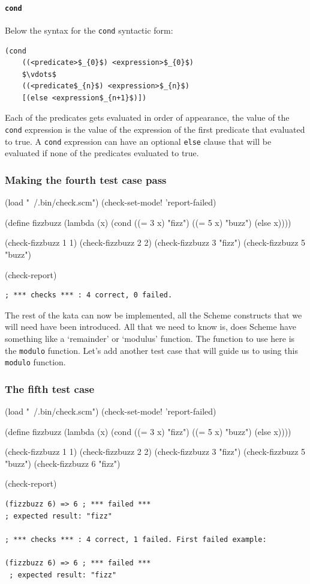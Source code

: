 \documentclass[12pt,a4paper,english,twoside]{article}
\begin{document}
\paragraph{\texttt{cond}}
Below the syntax for the \texttt{cond} syntactic form:
\begin{lstlisting}[mathescape]
  (cond 
    ((<predicate>$_{0}$) <expression>$_{0}$)
    $\vdots$ 
    ((<predicate$_{n}$) <expression>$_{n}$)
    [(else <expression$_{n+1}$)])
\end{lstlisting}
Each of the predicates gets evaluated in order of appearance, the value of the 
\texttt{cond} expression is the value of the expression of the first predicate 
that evaluated to true. A \texttt{cond} expression can have an optional 
\texttt{else} clause that will be evaluated if none of the predicates 
evaluated to true.
\subsubsection{Making the fourth test case pass}
\begin{schemecode}
(load "~/.bin/check.scm")
(check-set-mode! 'report-failed)

(define fizzbuzz 
  (lambda (x) 
    (cond ((= 3 x) "fizz")
          ((= 5 x) "buzz")
          (else x))))

(check-fizzbuzz 1 1)
(check-fizzbuzz 2 2)
(check-fizzbuzz 3 "fizz")
(check-fizzbuzz 5 "buzz")

(check-report)
\end{schemecode}
\begin{lstlisting}
; *** checks *** : 4 correct, 0 failed.  
\end{lstlisting}
The rest of the kata can now be implemented, all the Scheme constructs that we 
will need have been introduced. All that we need to know is, does Scheme have 
something like a `remainder' or `modulus' function. The function to use here 
is the \texttt{modulo} function. Let's add another test case that will guide 
us to using this \texttt{modulo} function.
\subsubsection{The fifth test case}
\begin{schemecode}
(load "~/.bin/check.scm")
(check-set-mode! 'report-failed)

(define fizzbuzz 
  (lambda (x) 
    (cond ((= 3 x) "fizz")
          ((= 5 x) "buzz")
          (else x))))

(check-fizzbuzz 1 1)
(check-fizzbuzz 2 2)
(check-fizzbuzz 3 "fizz")
(check-fizzbuzz 5 "buzz")
(check-fizzbuzz 6 "fizz")

(check-report)
\end{schemecode}
\begin{lstlisting}
(fizzbuzz 6) => 6 ; *** failed ***
; expected result: "fizz"

; *** checks *** : 4 correct, 1 failed. First failed example:

(fizzbuzz 6) => 6 ; *** failed ***
 ; expected result: "fizz"
\end{lstlisting}
\end{document}
